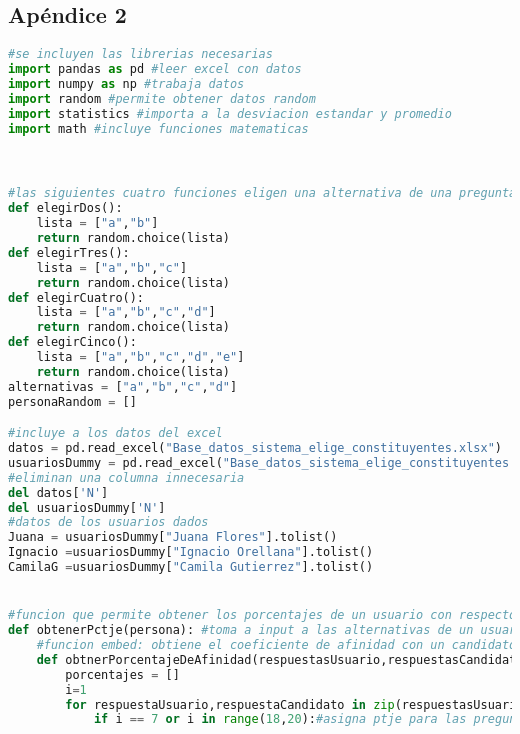 \documentclass[a4paper]{article}
\begin{document}
\subsection{Apéndice 2}
\begin{lstlisting}[language=Python]
#se incluyen las librerias necesarias
import pandas as pd #leer excel con datos
import numpy as np #trabaja datos
import random #permite obtener datos random
import statistics #importa a la desviacion estandar y promedio
import math #incluye funciones matematicas



#las siguientes cuatro funciones eligen una alternativa de una pregunta con la cantidad de alternativas correspondiente
def elegirDos():
    lista = ["a","b"]
    return random.choice(lista)
def elegirTres():
    lista = ["a","b","c"]
    return random.choice(lista)
def elegirCuatro():
    lista = ["a","b","c","d"]
    return random.choice(lista)
def elegirCinco():
    lista = ["a","b","c","d","e"]
    return random.choice(lista)
alternativas = ["a","b","c","d"]
personaRandom = []

#incluye a los datos del excel
datos = pd.read_excel("Base_datos_sistema_elige_constituyentes.xlsx")
usuariosDummy = pd.read_excel("Base_datos_sistema_elige_constituyentes.xlsx", sheet_name = "Respuestas usuariosas")
#eliminan una columna innecesaria
del datos['N']
del usuariosDummy['N']
#datos de los usuarios dados
Juana = usuariosDummy["Juana Flores"].tolist()
Ignacio =usuariosDummy["Ignacio Orellana"].tolist()
CamilaG =usuariosDummy["Camila Gutierrez"].tolist()


#funcion que permite obtener los porcentajes de un usuario con respecto a todos los candidatos
def obtenerPctje(persona): #toma a input a las alternativas de un usuario
    #funcion embed: obtiene el coeficiente de afinidad con un candidato
    def obtnerPorcentajeDeAfinidad(respuestasUsuario,respuestasCandidato):
        porcentajes = []
        i=1
        for respuestaUsuario,respuestaCandidato in zip(respuestasUsuario,respuestasCandidato):
            if i == 7 or i in range(18,20):#asigna ptje para las preguntas de 5 alternativas


\end{lstlisting}
\end{document}

